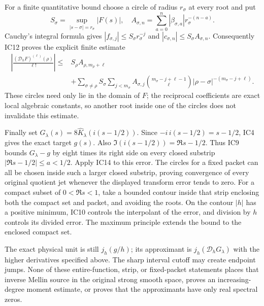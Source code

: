 For a finite quantitative bound choose a circle of radius $r_\sigma$
at every root and put
\[
 S_\sigma=\sup_{|s-\sigma|=r_\sigma}|F(s)|,
 \quad A_{\sigma,n}=\sum_{a=0}^n|\beta_{\sigma,a}|r_\sigma^{-(n-a)}.
\]
Cauchy's integral formula gives
$|f_{\sigma,j}|\le S_\sigma r_\sigma^{-j}$ and
$|c_{\sigma,n}|\le S_\sigma A_{\sigma,n}$. Consequently IC12
proves the explicit finite estimate
\begin{equation}\tag{IC14}
 \begin{split}
 \left|\frac{(\mathcal D_hF)^{(\ell)}(\rho)}{\ell!}\right|
 \le{}&S_\rho A_{\rho,m_\rho+\ell}\\
 &+\sum_{\sigma\ne\rho}S_\sigma\sum_{j<m_\sigma}
 A_{\sigma,j}\binom{m_\sigma-j+\ell-1}{\ell}
 |\rho-\sigma|^{-(m_\sigma-j+\ell)}.
 \end{split}
\end{equation}
These circles need only lie in the domain of $F$; the reciprocal
coefficients are exact local algebraic constants, so another root
inside one of the circles does not invalidate this estimate.

Finally set $G_\lambda(s)=8\widehat K_\lambda(i(s-1/2))$.
Since $-i\,i(s-1/2)=s-1/2$, IC4 gives the exact target $g(s)$.
Also $\Im(i(s-1/2))=\Re s-1/2$. Thus IC9 bounds
$G_\lambda-g$ by eight times its right side on every closed
substrip $|\Re s-1/2|\le a<1/2$. Apply IC14 to this error.
The circles for a fixed packet can all be chosen inside such
a larger closed substrip, proving convergence of every original
quotient jet whenever the displayed transform error tends to zero.
For a compact subset of $0<\Re s<1$, take a bounded contour
inside that strip enclosing both the compact set and packet,
and avoiding the roots. On the contour $|h|$ has a positive
minimum, IC10 controls the interpolant of the error, and division
by $h$ controls its divided error. The maximum principle extends
the bound to the enclosed compact set.

The exact physical unit is still $j_h(g/h)$; its approximant is
$j_h(\mathcal D_hG_\lambda)$ with the higher derivatives specified
above. The sharp interval cutoff may create endpoint jumps.
None of these entire-function, strip, or fixed-packet statements
places that inverse Mellin source in the original strong smooth
space, proves an increasing-degree moment estimate, or proves
that the approximants have only real spectral zeros.

